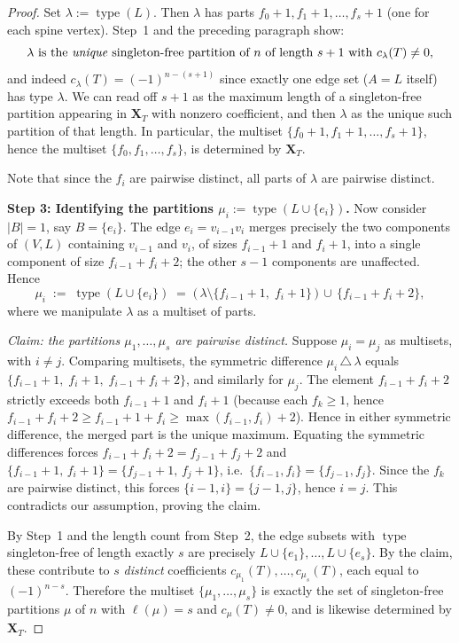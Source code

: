 \documentclass[11pt]{article}
\theoremstyle{definition}
\newcommand{\X}{\mathbf{X}}
\newcommand{\type}{\operatorname{type}}
\begin{document}
\begin{proof}
Set $\lambda := \type(L)$.  Then $\lambda$ has parts $f_0+1, f_1+1,
\ldots, f_s+1$ (one for each spine vertex).  Step~1 and the preceding
paragraph show:
\[
   \lambda \text{ is the \emph{unique} singleton-free partition of $n$
   of length $s+1$ with } c_\lambda(T)\neq 0,
\]
and indeed $c_\lambda(T) = (-1)^{n-(s+1)}$ since exactly one edge set
($A=L$ itself) has type $\lambda$.  We can read off $s+1$ as the
maximum length of a singleton-free partition appearing in
$\X_T$ with nonzero coefficient, and then $\lambda$ as the unique such
partition of that length.  In particular, the multiset
$\{f_0+1,f_1+1,\ldots,f_s+1\}$, hence the multiset
$\{f_0,f_1,\ldots,f_s\}$, is determined by $\X_T$.

Note that since the $f_i$ are pairwise distinct, all parts of $\lambda$
are pairwise distinct.

\medskip\noindent
\textbf{Step 3: Identifying the partitions $\mu_i := \type(L\cup\{e_i\})$.}
Now consider $|B|=1$, say $B = \{e_i\}$.  The edge $e_i = v_{i-1}v_i$
merges precisely the two components of $(V,L)$ containing $v_{i-1}$ and
$v_i$, of sizes $f_{i-1}+1$ and $f_i+1$, into a single component of
size $f_{i-1}+f_i+2$; the other $s-1$ components are unaffected.  Hence
\[
   \mu_i \;:=\; \type(L\cup\{e_i\})
   \;=\; \bigl(\,\lambda \setminus \{f_{i-1}+1,\;f_i+1\}\,\bigr)
         \,\cup\, \{f_{i-1}+f_i+2\},
\]
where we manipulate $\lambda$ as a multiset of parts.

\emph{Claim: the partitions $\mu_1,\ldots,\mu_s$ are pairwise distinct.}
Suppose $\mu_i = \mu_j$ as multisets, with $i\neq j$.  Comparing
multisets, the symmetric difference $\mu_i\,\triangle\,\lambda$ equals
$\{f_{i-1}+1,\;f_i+1,\;f_{i-1}+f_i+2\}$, and similarly for $\mu_j$.
The element $f_{i-1}+f_i+2$ strictly exceeds both $f_{i-1}+1$ and
$f_i+1$ (because each $f_k\geq 1$, hence
$f_{i-1}+f_i+2\geq f_{i-1}+1+f_i \geq \max(f_{i-1},f_i)+2$).  Hence in
either symmetric difference, the merged part is the unique maximum.
Equating the symmetric differences forces
$f_{i-1}+f_i+2 = f_{j-1}+f_j+2$ and
$\{f_{i-1}+1,\,f_i+1\}=\{f_{j-1}+1,\,f_j+1\}$, i.e.\
$\{f_{i-1},f_i\}=\{f_{j-1},f_j\}$.
Since the $f_k$ are pairwise distinct, this forces
$\{i-1,i\}=\{j-1,j\}$, hence $i=j$.  This contradicts our assumption,
proving the claim.

By Step~1 and the length count from Step~2, the edge subsets with
$\type$ singleton-free of length exactly $s$ are precisely
$L\cup\{e_1\},\ldots,L\cup\{e_s\}$.  By the claim, these contribute
to $s$ \emph{distinct} coefficients $c_{\mu_1}(T),\ldots,c_{\mu_s}(T)$,
each equal to $(-1)^{n-s}$.  Therefore the multiset
$\{\mu_1,\ldots,\mu_s\}$ is exactly the set of singleton-free
partitions $\mu$ of $n$ with $\ell(\mu)=s$ and $c_\mu(T)\neq 0$, and is
likewise determined by $\X_T$.


\end{proof}
\end{document}
